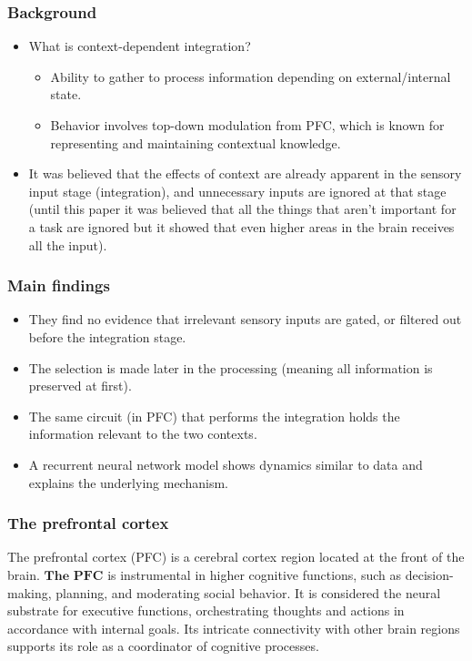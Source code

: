 \documentclass[11pt]{book} %
\begin{document}
\subsubsection{Background}

\begin{itemize}
    \item What is context-dependent integration?
    \begin{itemize}
        \item Ability to gather to process information depending on external/internal state.
        \item Behavior involves top-down modulation from PFC, which is known for representing and maintaining contextual knowledge.
    \end{itemize}
    \item It was believed that the effects of context are already apparent in the sensory input stage (integration), 
    and unnecessary inputs are ignored at that stage (until this paper it was believed that all the things that aren't important for a task are ignored but it showed 
    that even higher areas in the brain receives all the input).
\end{itemize}

\subsubsection{Main findings}

\begin{itemize}
    \item They find no evidence that irrelevant sensory inputs are gated, or filtered out before the integration stage.
    \item The selection is made later in the processing (meaning all information is preserved at first).
    \item The same circuit (in PFC) that performs the integration holds the information relevant to the two contexts.
    \item A recurrent neural network model shows dynamics similar to data and explains the underlying mechanism.
\end{itemize}


\subsubsection{The prefrontal cortex}

The prefrontal cortex (PFC) is a cerebral cortex region located at the front of the brain. 
$\textbf{The PFC}$ is instrumental in higher cognitive functions, such as decision-making, planning, and moderating social behavior. 
It is considered the neural substrate for executive functions, orchestrating thoughts and actions in accordance with internal goals.
Its intricate connectivity with other brain regions supports its role as a coordinator of cognitive processes.
\end{document}

